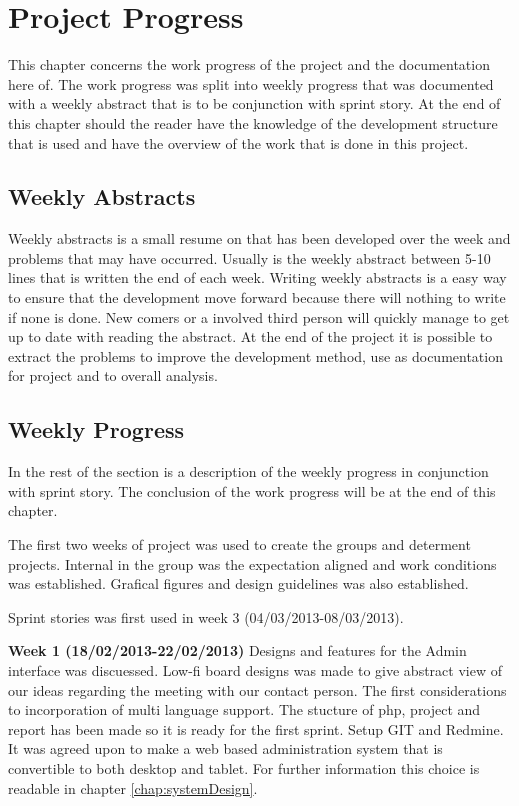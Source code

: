 \chapter{Project Progress}
\label{sec:projectProgress}
This chapter concerns the work progress of the project and the documentation here of. 
The work progress was split into weekly progress that was documented with a weekly abstract that is to be conjunction with sprint story.  
At the end of this chapter should the reader have the knowledge of the development structure that is used and have the overview of the work that is done in this project. 


\section{Weekly Abstracts}      
\label{subsec:weeklyAbstracts}
Weekly abstracts is a small resume on that has been developed over the week and problems that may have occurred. 
Usually is the weekly abstract between 5-10 lines that is written the end of each week. 
Writing weekly abstracts is a easy way to ensure that the development move forward because there will nothing to write if none is done.
New comers or a involved third person will quickly manage to get up to date with reading the abstract. 
At the end of the project it is possible to extract the problems to improve the development method, use as documentation for project and to overall analysis.          

\section{Weekly Progress}
\label{subsec:weeklyProgress}
In the rest of the section is a description of the weekly progress in conjunction with sprint story.
The conclusion of the work progress will be at the end of this chapter. 

The first two weeks of project was used to create the groups and determent projects.  
Internal in the group was the expectation aligned and work conditions was established.
Grafical figures and design guidelines was also established.      

Sprint stories was first used in week 3 (04/03/2013-08/03/2013).   

\textbf{Week 1 (18/02/2013-22/02/2013)} 
Designs and features for the Admin interface was discuessed.
Low-fi board designs was made to give abstract view of our ideas regarding the meeting with our contact person.   
The first considerations to incorporation of multi language support.
The stucture of php, project and report has been made so it is ready for the first sprint.
Setup GIT and Redmine.
It was agreed upon to make a web based administration system that is convertible to both desktop and tablet.  
For further information this choice is readable in chapter \vref{chap:systemDesign}.

